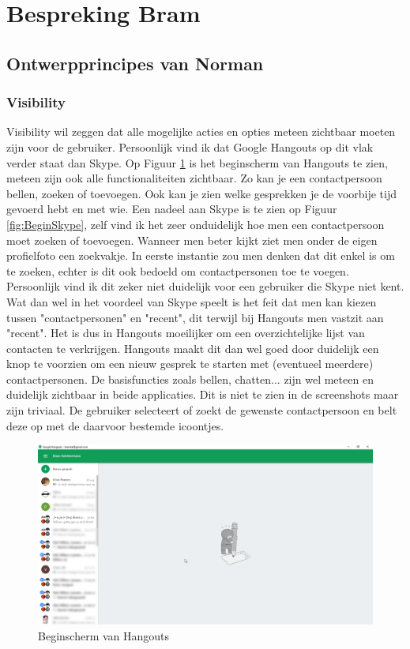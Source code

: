 \documentclass[11pt]{article}
\begin{document}
\section{Bespreking Bram}
\subsection{Ontwerpprincipes van Norman}
\subsubsection{Visibility}
Visibility wil zeggen dat alle mogelijke acties en opties meteen zichtbaar moeten zijn voor de gebruiker. Persoonlijk vind ik dat Google Hangouts op dit vlak verder staat dan Skype. Op Figuur \ref{fig:BeginHangouts} is het beginscherm van Hangouts te zien, meteen zijn ook alle functionaliteiten zichtbaar. Zo kan je een contactpersoon bellen, zoeken of toevoegen. Ook kan je zien welke gesprekken je de voorbije tijd gevoerd hebt en met wie. Een nadeel aan Skype is te zien op Figuur \ref{fig:BeginSkype}, zelf vind ik het zeer onduidelijk hoe men een contactpersoon moet zoeken of toevoegen. Wanneer men beter kijkt ziet men onder de eigen profielfoto een zoekvakje. In eerste instantie zou men denken dat dit enkel is om te zoeken, echter is dit ook bedoeld om contactpersonen toe te voegen. Persoonlijk vind ik dit zeker niet duidelijk voor een gebruiker die Skype niet kent. Wat dan wel in het voordeel van Skype speelt is het feit dat men kan kiezen tussen "contactpersonen" en "recent", dit terwijl bij Hangouts men vastzit aan "recent". Het is dus in Hangouts moeilijker om een overzichtelijke lijst van contacten te verkrijgen. Hangouts maakt dit dan wel goed door duidelijk een knop te voorzien om een nieuw gesprek te starten met (eventueel meerdere) contactpersonen.
\newline
De basisfuncties zoals bellen, chatten... zijn wel meteen en duidelijk zichtbaar in beide applicaties. Dit is niet te zien in de screenshots maar zijn triviaal. De gebruiker selecteert of zoekt de gewenste contactpersoon en belt deze op met de daarvoor bestemde icoontjes.
\begin{figure}
	\centering
	\includegraphics[width=1\textwidth]{Bram_ScreenshotGH1.png}
	\caption{Beginscherm van Hangouts}
	\label{fig:BeginHangouts}
\end{figure}
\end{document}
